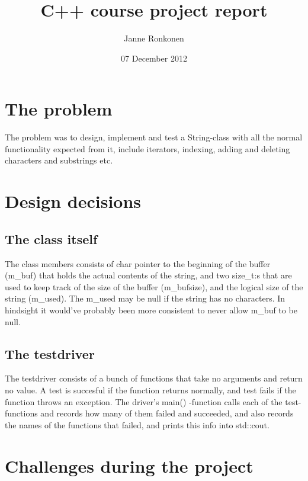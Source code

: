 \documentclass[11pt]{article}
\title{C++ course project report}
\author{Janne Ronkonen}
\date{07 December 2012}
\begin{document}
\maketitle

\setcounter{tocdepth}{3}
\vspace*{1cm}


\section{The problem}


The problem was to design, implement and test a String-class with all
the normal functionality expected from it, include iterators,
indexing, adding and deleting characters and substrings etc. 


\section{Design decisions}
\label{sec-2}

\subsection{The class itself}
\label{sec-2.1}

The class members consists of char pointer to the beginning of the
buffer (m\_buf) that holds the actual contents of the string, and two
size\_t:s that are used to keep track of the size of the buffer
(m\_bufsize), and the logical size of the string (m\_used).  The m\_used
may be null if the string has no characters. In hindsight it would've
probably been more consistent to never allow m\_buf to be null.

\subsection{The testdriver}
\label{sec-2.2}

The testdriver consists of a bunch of functions that take no arguments
and return no value. A test is succesful if the function returns
normally, and test fails if the function throws an exception. The
driver's main() -function calls each of the test-functions and records
how many of them failed and succeeded, and also records the names of
the functions that failed, and prints this info into std::cout.


\section{Challenges during the project}
\end{document}
